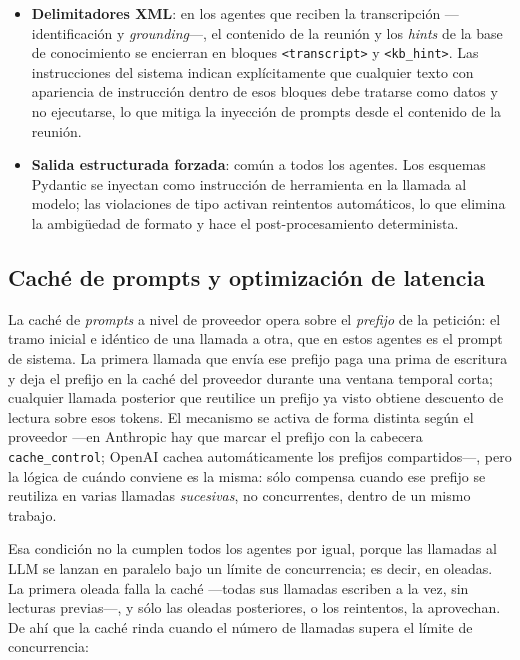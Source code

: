 \begin{itemize}
  \item \textbf{Delimitadores XML}: en los agentes que reciben la transcripción —identificación y
        \textit{grounding}—, el contenido de la reunión y los \textit{hints} de la base de
        conocimiento se encierran en bloques \texttt{<transcript>} y \texttt{<kb\_hint>}. Las
        instrucciones del sistema indican explícitamente que cualquier texto con apariencia de
        instrucción dentro de esos bloques debe tratarse como datos y no ejecutarse, lo que mitiga
        la inyección de prompts desde el contenido de la reunión.

  \item \textbf{Salida estructurada forzada}: común a todos los agentes. Los esquemas Pydantic se
        inyectan como instrucción de herramienta en la llamada al modelo; las violaciones de tipo
        activan reintentos automáticos, lo que elimina la ambigüedad de formato y hace el
        post-procesamiento determinista.
\end{itemize}



\subsection{Caché de prompts y optimización de latencia}
\label{anx:cache-prompts}

La caché de \textit{prompts} a nivel de proveedor opera sobre el \emph{prefijo} de la petición: el
tramo inicial e idéntico de una llamada a otra, que en estos agentes es el prompt de sistema. La
primera llamada que envía ese prefijo paga una prima de escritura y deja el prefijo en la caché del
proveedor durante una ventana temporal corta; cualquier llamada posterior que reutilice un prefijo
ya visto obtiene descuento de lectura sobre esos tokens. El mecanismo se activa de forma distinta
según el proveedor —en Anthropic hay que marcar el prefijo con la cabecera \texttt{cache\_control};
OpenAI cachea automáticamente los prefijos compartidos—, pero la lógica de cuándo conviene es la misma:
sólo compensa cuando ese prefijo se reutiliza en varias llamadas \emph{sucesivas}, no concurrentes,
dentro de un mismo trabajo.

Esa condición no la cumplen todos los agentes por igual, porque las llamadas al \ac{LLM} se lanzan
en paralelo bajo un límite de concurrencia; es decir, en oleadas. La primera oleada falla la caché
—todas sus llamadas escriben a la vez, sin lecturas previas—, y sólo las oleadas posteriores, o los
reintentos, la aprovechan. De ahí que la caché rinda cuando el número de llamadas supera el límite
de concurrencia:

